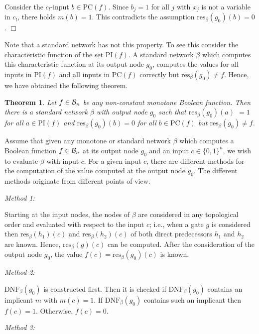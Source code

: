 \documentclass[11pt]{article}
\newtheorem{theo}{Theorem}
\begin{document}
Consider the $c_l$-input $b \in \mbox{PC}(f)$. Since $b_j = 1$ for all $j$ with $x_j$ is not a variable in $c_l$, there
holds $m(b) = 1$. This contradicts the assumption $\mbox{res}_{\beta}(g_0)(b) = 0$.
$\Box$

\smallskip
Note that a standard network has not this property. To see this consider the characteristic function of the set
$\mbox{PI}(f)$. A standard network $\beta$ which computes this characteristic function at its output node $g_0$,
computes the values for all inputs in $\mbox{PI}(f)$ and all inputs in $\mbox{PC}(f)$ correctly but
$\mbox{res}_{\beta}(g_0) \not= f$. Hence, we have obtained the following theorem.
\begin{theo} \label{theo2.3}
  Let $f \in {\cal B}_n$ be any non-constant monotone Boolean function. Then there is a standard network
  $\beta$ with output node $g_0$ such that $\mbox{res}_{\beta}(g_0)(a)$ $= 1$ for all $a \in \mbox{PI}(f)$ and
  $\mbox{res}_{\beta}(g_0)(b) = 0$ for all $b \in \mbox{PC}(f)$ but $\mbox{res}_{\beta}(g_0) \not= f$.
\end{theo}

Assume that given any monotone or standard network $\beta$ which computes a Boolean function $f \in {\cal B}_n$
at its output node $g_0$ and an input $c \in \{0,1\}^n$, we wish to evaluate $\beta$ with input $c$. For a given
input $c$, there are different methods for the computation of the value computed at the output node $g_0$.
The different methods originate from different points of view.

\smallskip
\noindent
{\em Method 1:}

\smallskip
Starting at the input nodes,
the nodes of $\beta$ are considered in any topological order and evaluated with respect to the input $c$;
i.e., when a gate $g$ is considered then $\mbox{res}_{\beta}(h_1)(c)$ and $\mbox{res}_{\beta}(h_2)(c)$ of both direct
predecessors $h_1$ and $h_2$ are known. Hence, $\mbox{res}_{\beta}(g)(c)$ can be computed. After the consideration
of the output node $g_0$, the value $f(c) = \mbox{res}_{\beta}(g_0)(c)$ is known.

\smallskip
\noindent
{\em Method 2:}

\smallskip
$\mbox{DNF}_{\beta}(g_0)$ is constructed first. Then it is checked if $\mbox{DNF}_{\beta}(g_0)$ contains an implicant
$m$ with $m(c) = 1$. If $\mbox{DNF}_{\beta}(g_0)$ contains such an implicant then $f(c) = 1$. Otherwise, $f(c) = 0$.

\smallskip
\noindent
{\em Method 3:}
\end{document}
